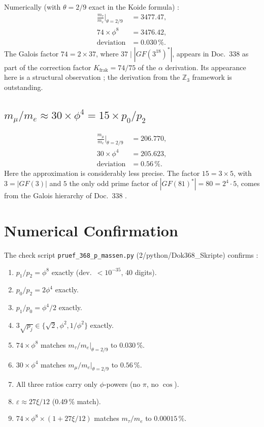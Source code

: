 Numerically (with $\theta=2/9$ exact in the Koide formula) \KM:
\begin{align}
  \frac{m_\tau}{m_e}\bigl|_{\theta=2/9} &= 3477{.}47,\\
  74\times\phi^8 &= 3476{.}42,\\
  \text{deviation} &= 0{.}030\,\%.
\end{align}
The Galois factor $74=2\times37$, where $37\mid|GF(3^{18})^*|$, appears
in Doc.~338 as part of the correction factor $K_\text{frak}=74/75$ of the
$\alpha$ derivation. Its appearance here is a structural observation \SM;
the derivation from the $\mathbb{Z}_3$ framework is outstanding.

\subsection{$m_\mu/m_e \approx 30\times\phi^4 = 15\times p_0/p_2$}

\begin{align}
  \frac{m_\mu}{m_e}\bigl|_{\theta=2/9} &= 206{.}770,\\
  30\times\phi^4 &= 205{.}623,\\
  \text{deviation} &= 0{.}56\,\%.
\end{align}
Here the approximation is considerably less precise. The factor $15=3\times5$,
with $3=|GF(3)|$ and $5$ the only odd prime factor of $|GF(81)^*| = 80 = 2^4\cdot5$, comes from the Galois
hierarchy of Doc.~338 \SM.

\section{Numerical Confirmation}

The check script \texttt{pruef\_368\_p\_massen.py} (2/python/Dok368\_Skripte)
confirms \KM:
\begin{enumerate}
  \item $p_1/p_2=\phi^8$ exactly (dev.\ $<10^{-35}$, 40 digits).
  \item $p_0/p_2=2\phi^4$ exactly.
  \item $p_1/p_0=\phi^4/2$ exactly.
  \item $3\sqrt{p_j}\in\{\sqrt2,\phi^2,1/\phi^2\}$ exactly.
  \item $74\times\phi^8$ matches $m_\tau/m_e|_{\theta=2/9}$ to $0{.}030\,\%$.
  \item $30\times\phi^4$ matches $m_\mu/m_e|_{\theta=2/9}$ to $0{.}56\,\%$.
  \item All three ratios carry only $\phi$-powers (no $\pi$, no $\cos$).
  \item $\varepsilon \approx 27\xi/12$ (0.49\,\% match).
  \item $74\times\phi^8\times(1+27\xi/12)$ matches $m_\tau/m_e$ to $0{.}00015\,\%$.
\end{enumerate}

